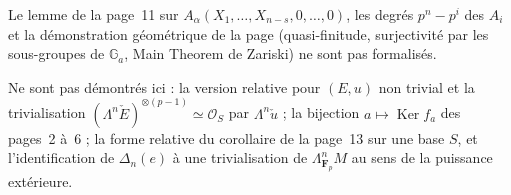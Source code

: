 \noindent Le lemme de la page~11 sur $A_\alpha(X_1, \dots, X_{n-s}, 0, \dots, 0)$, les degrés $p^n - p^i$ des $A_i$ et la démonstration géométrique de la page (quasi-finitude, surjectivité par les sous-groupes de $\mathbb G_a$, Main Theorem de Zariski) ne sont pas formalisés.

Ne sont pas démontrés ici : la version relative pour $(E, u)$ non trivial et la trivialisation $(\Lambda^n \check E)^{\otimes(p-1)} \simeq \mathcal O_S$ par $\Lambda^n \check u$ ; la bijection $a \mapsto \operatorname{Ker} f_a$ des pages~2 à~6 ; la forme relative du corollaire de la page~13 sur une base $S$, et l'identification de $\Delta_n(e)$ à une trivialisation de $\Lambda^n_{\mathbf F_p} M$ au sens de la puissance extérieure.
